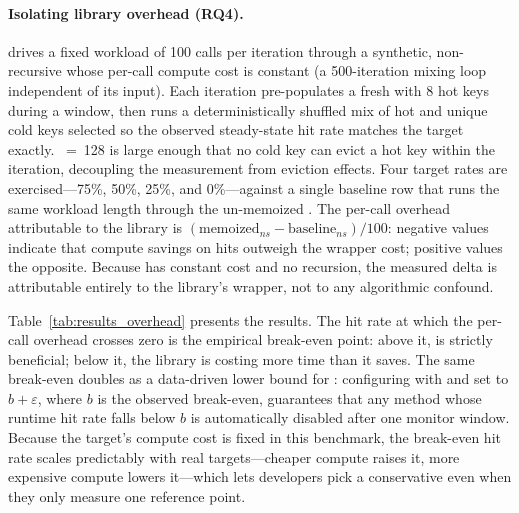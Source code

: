 \paragraph{Isolating library overhead (RQ4).}
 drives a fixed workload of 100 calls per iteration through a synthetic, non-recursive  whose per-call compute cost is constant (a 500-iteration mixing loop independent of its input). Each iteration pre-populates a fresh  with 8 hot keys during a  window, then runs a deterministically shuffled mix of hot and unique cold keys selected so the observed steady-state hit rate matches the target exactly. ~=~128 is large enough that no cold key can evict a hot key within the iteration, decoupling the measurement from eviction effects. Four target rates are exercised---75\%, 50\%, 25\%, and 0\%---against a single baseline row that runs the same workload length through the un-memoized . The per-call overhead attributable to the library is $(\text{memoized}_{ns} - \text{baseline}_{ns})/100$: negative values indicate that compute savings on hits outweigh the wrapper cost; positive values the opposite. Because  has constant cost and no recursion, the measured delta is attributable entirely to the library's wrapper, not to any algorithmic confound.



Table~\ref{tab:results_overhead} presents the results. The hit rate at which the per-call overhead crosses zero is the empirical break-even point: above it,  is strictly beneficial; below it, the library is costing more time than it saves. The same break-even doubles as a data-driven lower bound for : configuring  with  and  set to $b + \varepsilon$, where $b$ is the observed break-even, guarantees that any method whose runtime hit rate falls below $b$ is automatically disabled after one monitor window. Because the target's compute cost is fixed in this benchmark, the break-even hit rate scales predictably with real targets---cheaper compute raises it, more expensive compute lowers it---which lets developers pick a conservative  even when they only measure one reference point.

